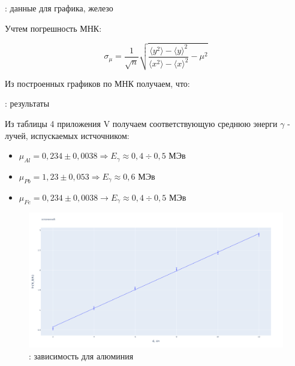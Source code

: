	\begin{table}[h!]
		\centering
		
		\caption{: данные для графика, железо}
	\label{tb6}
	\end{table}

	Учтем погрешность МНК:

	\[ \sigma_{\mu} = \dfrac{1}{\sqrt{n}}\sqrt{\dfrac{\langle y^2 \rangle - \langle y \rangle^2}{\langle x^2 \rangle - \langle x \rangle^2} - \mu^{2}} \]

	Из построенных графиков по МНК получаем, что:

	\begin{table}[h!]
		\centering
		
		\caption{: результаты}
	\label{tb6}
	\end{table}

	Из таблицы 4 приложения V получаем соответствующую среднюю энерги $\gamma$ - лучей, испускаемых истчочником:

	\begin{itemize}
		\item $\mu_{Al} = 0,234 \pm 0,0038 \Rightarrow E_{\gamma} \approx 0,4 \div 0,5 \text{ МЭв} $
		\item $\mu_{Pb} = 1,23 \pm 0,053 \Rightarrow E_{\gamma} \approx 0,6 \text{ МЭв} $
		\item $\mu_{Fe} = 0,234 \pm 0,0038 \rightarrow E_{\gamma} \approx 0,4 \div 0,5 \text{ МЭв} $
	\end{itemize}

	\begin{figure}[h!]
		\centering
		\includegraphics[width=1.0\linewidth]{pics/al.png}
		\caption{ : зависимость для алюминия}
		\label{al}
	\end{figure}


